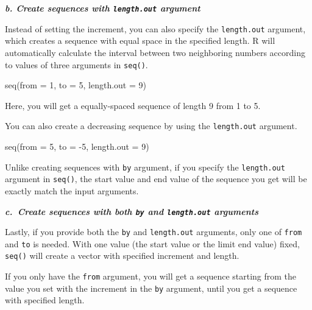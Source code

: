 \documentclass[
]{book}
\newenvironment{Shaded}{\begin{snugshade}}{\end{snugshade}}
\newcommand{\AttributeTok}[1]{\textcolor[rgb]{0.77,0.63,0.00}{#1}}
\newcommand{\DecValTok}[1]{\textcolor[rgb]{0.00,0.00,0.81}{#1}}
\newcommand{\FunctionTok}[1]{\textcolor[rgb]{0.00,0.00,0.00}{#1}}
\newcommand{\NormalTok}[1]{#1}
\newcommand{\SpecialCharTok}[1]{\textcolor[rgb]{0.00,0.00,0.00}{#1}}
\newenvironment{infobox}[1]
  {
  \begin{itemize}
  \renewcommand{\labelitemi}{
    \raisebox{-.7\height}[0pt][0pt]{
      {\setkeys{Gin}{width=3em,keepaspectratio}
        \texttt{[image: pics/\#1]}}
    }
  }
  \setlength{\fboxsep}{1em}
  \begin{blackbox}
  \item
  }
  {
  \end{blackbox}
  \end{itemize}
  }
\newenvironment{blackbox}{
  \definecolor{shadecolor}{rgb}{0, 0, 0}  %
  \color{white}
  \begin{shaded}}
 {\end{shaded}}
\begin{document}
\textbf{\emph{b. Create sequences with \texttt{length.out} argument}}

Instead of setting the increment, you can also specify the \texttt{length.out} argument, which creates a sequence with equal space in the specified length. R will automatically calculate the interval between two neighboring numbers according to values of three arguments in \texttt{seq()}.

\begin{Shaded}
\begin{Highlighting}[]
\FunctionTok{seq}\NormalTok{(}\AttributeTok{from =} \DecValTok{1}\NormalTok{, }\AttributeTok{to =} \DecValTok{5}\NormalTok{, }\AttributeTok{length.out =} \DecValTok{9}\NormalTok{) }
\end{Highlighting}
\end{Shaded}

Here, you will get a equally-spaced sequence of length 9 from 1 to 5.

You can also create a decreasing sequence by using the \texttt{length.out} argument.

\begin{Shaded}
\begin{Highlighting}[]
\FunctionTok{seq}\NormalTok{(}\AttributeTok{from =} \DecValTok{5}\NormalTok{, }\AttributeTok{to =} \SpecialCharTok{{-}}\DecValTok{5}\NormalTok{, }\AttributeTok{length.out =} \DecValTok{9}\NormalTok{) }
\end{Highlighting}
\end{Shaded}

\begin{infobox}{caution}
Unlike creating sequences with \texttt{by} argument, if you specify the \texttt{length.out} argument in \texttt{seq()}, the start value and end value of the sequence you get will be exactly match the input arguments.

\end{infobox}

\textbf{\emph{c.~Create sequences with both \texttt{by} and \texttt{length.out} arguments}}

Lastly, if you provide both the \texttt{by} and \texttt{length.out} arguments, only one of \texttt{from} and \texttt{to} is needed. With one value (the start value or the limit end value) fixed, \texttt{seq()} will create a vector with specified increment and length.

If you only have the \texttt{from} argument, you will get a sequence starting from the value you set with the increment in the \texttt{by} argument, until you get a sequence with specified length.
\end{document}
